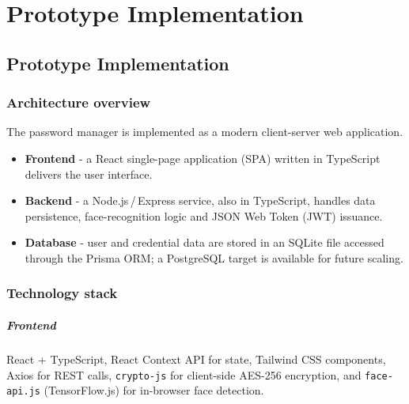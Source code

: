 

\chapter{Prototype Implementation}%
\label{ch:implementatie}


\section{Prototype Implementation}

\subsection{Architecture overview}
The password manager is implemented as a modern client-server web application.  
\begin{itemize}
  \item \textbf{Frontend} - a React single-page application (SPA) written in TypeScript delivers the user interface.  
  \item \textbf{Backend} - a Node.js\,/\,Express service, also in TypeScript, handles data persistence, face-recognition logic and JSON Web Token (JWT) issuance.  
  \item \textbf{Database} - user and credential data are stored in an SQLite file accessed through the Prisma ORM; a PostgreSQL target is available for future scaling.  
\end{itemize}

\subsection{Technology stack}
\paragraph{Frontend}
React {+} TypeScript, React Context API for state, Tailwind CSS components, Axios for REST calls, \texttt{crypto-js} for client-side AES-256 encryption, and \texttt{face-api.js} (TensorFlow.js) for in-browser face detection.

